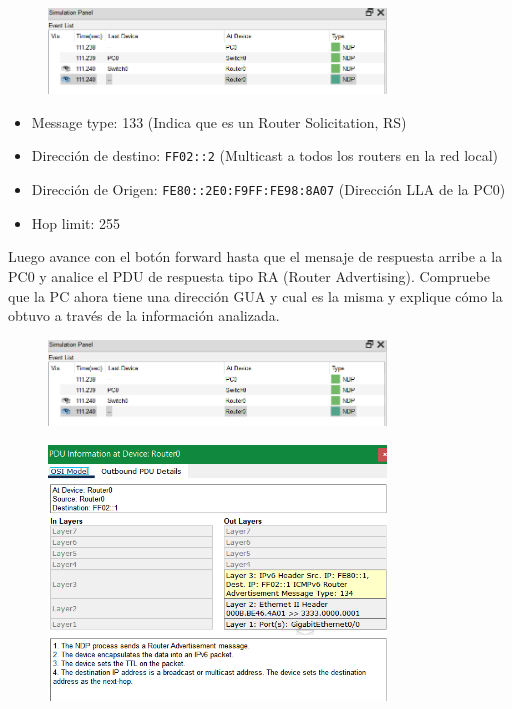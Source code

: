 \documentclass{article}
\begin{document}
\begin{figure}[h]
    \centering
    \includegraphics[width=0.8\textwidth]{6.png}
\end{figure}


\begin{itemize}
    \item Message type: 133 (Indica que es un Router Solicitation, RS)
    \item Dirección de destino: \texttt{FF02::2} (Multicast a todos los routers en la red local)
    \item Dirección de Origen: \texttt{FE80::2E0:F9FF:FE98:8A07} (Dirección LLA de la PC0)
    \item Hop limit: 255
\end{itemize}

Luego avance con el botón forward hasta que el mensaje de respuesta arribe a la PC0 y analice el PDU de respuesta tipo RA (Router Advertising). Compruebe que la PC ahora tiene una dirección GUA y cual es la misma y explique cómo la obtuvo a través de la información analizada.
\begin{figure}[h]
    \centering
    \includegraphics[width=0.8\textwidth]{6.png}
\end{figure}
\begin{figure}[h]
    \centering
    \includegraphics[width=0.8\textwidth]{7.png}
\end{figure}
\end{document}
